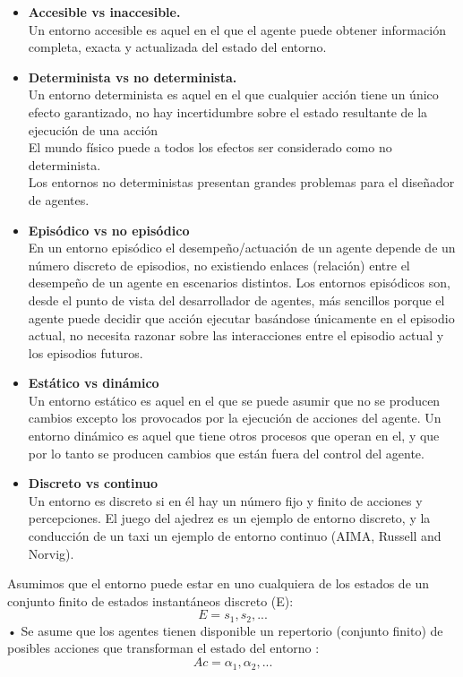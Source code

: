 \begin{itemize}
   \item \textbf{Accesible vs inaccesible.}\\
   Un entorno accesible es aquel en el que el agente puede
   obtener información completa, exacta y actualizada del
   estado del entorno.
   \item \textbf{Determinista vs no determinista.}\\
   Un entorno determinista es aquel en el que cualquier
   acción tiene un único efecto garantizado, no hay
   incertidumbre sobre el estado resultante de la ejecución de
   una acción\\
   El mundo físico puede a todos los efectos ser
   considerado como no determinista.\\
   Los entornos no deterministas presentan grandes
   problemas para el diseñador de agentes.
   \item \textbf{Episódico vs no episódico}\\
   En un entorno episódico el desempeño/actuación de un
   agente depende de un número discreto de episodios, no
   existiendo enlaces (relación) entre el desempeño de un agente
   en escenarios distintos.
   Los entornos episódicos son, desde el punto de vista del
   desarrollador de agentes, más sencillos porque el agente puede
   decidir que acción ejecutar basándose únicamente en el
   episodio actual, no necesita razonar sobre las interacciones
   entre el episodio actual y los episodios futuros.
   \item \textbf{Estático vs dinámico}\\
   Un entorno estático es aquel en el que se puede asumir que
   no se producen cambios excepto los provocados por la
   ejecución de acciones del agente.
   Un entorno dinámico es aquel que tiene otros procesos que
   operan en el, y que por lo tanto se producen cambios que están
   fuera del control del agente.
   \item \textbf{Discreto vs continuo}\\
   Un entorno es discreto si en él hay un número fijo y finito de
   acciones y percepciones.
   El juego del ajedrez es un ejemplo de entorno discreto, y la
   conducción de un taxi un ejemplo de entorno continuo (AIMA,
   Russell and Norvig).
\end{itemize}

Asumimos que el entorno puede estar en uno cualquiera de los
estados de un conjunto finito de estados instantáneos discreto
(E):
\begin{equation}
   E = { s_1,s_2,...}
\end{equation}
• Se asume que los agentes tienen disponible un repertorio
(conjunto finito) de posibles acciones que transforman el
estado del entorno :
\begin{equation}
   Ac = { \alpha_1,\alpha_2,...}
\end{equation}

